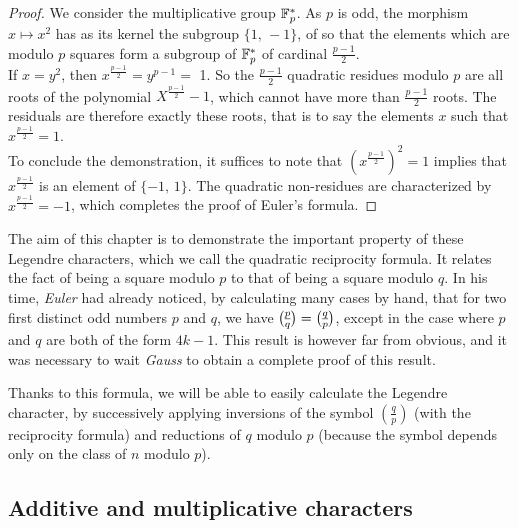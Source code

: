 \begin{proof}
We consider the multiplicative group $ \mathbb{F}_p^* $. As $ p $ is odd, the morphism $ x \mapsto x^2 $ has as its kernel the subgroup $ \{1, \, - 1\} $, of so that the elements which are modulo $ p $ squares form a subgroup of $ \mathbb{F}_p^* $ of cardinal $ \frac{p-1}{2} $. \\If $ x = y^2 $, then $ x^{\frac{p-1}{2}} = y^{p-1} = $ 1. So the $ \frac{p-1}{2} $ quadratic residues modulo $ p $ are all roots of the polynomial $ X^{\frac{p-1}{2}} - 1 $, which cannot have more than $ \frac{p-1}{2} $ roots. The residuals are therefore exactly these roots, that is to say the elements $ x $ such that $ x^{\frac{p-1}{2}} = 1 $. \\To conclude the demonstration, it suffices to note that $ \left(x^{\frac{p-1}{2}} \right)^2 = 1 $ implies that $ x^{\frac{p-1}{2}} $ is an element of $ \{- 1, \, 1\} $. The quadratic non-residues are characterized by $ x^\frac{p-1}{2} = -1 $, which completes the proof of Euler's formula.
\end{proof}
The aim of this chapter is to demonstrate the important property of these Legendre characters, which we call the quadratic reciprocity formula. It relates the fact of being a square modulo $ p $ to that of being a square modulo $ q $. In his time, \textit{Euler} had already noticed, by calculating many cases by hand, that for two first distinct odd numbers $ p $ and $ q $, we have $ \legsymb{p}{q} = \legsymb{q}{p} $, except in the case where $ p $ and $ q $ are both of the form $ 4 k - 1 $. This result is however far from obvious, and it was necessary to wait \textit{Gauss} to obtain a complete proof of this result.
 
 
Thanks to this formula, we will be able to easily calculate the Legendre character, by successively applying inversions of the symbol $ \left(\frac{q}{p} \right) $ (with the reciprocity formula) and reductions of $ q $ modulo $ p $ (because the symbol depends only on the class of $ n $ modulo $ p $).
\subsection{Additive and multiplicative characters}
 

